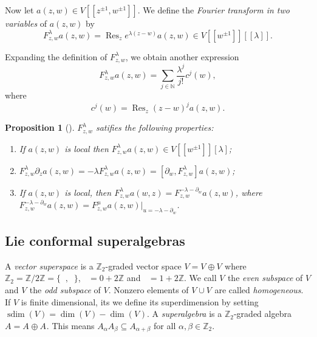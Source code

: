 \documentclass[a4paper, 12pt, reqno]{amsart}
\newtheorem{proposition}[theorem]{Proposition}
\theoremstyle{remark}
\numberwithin{equation}{subsection}
\DeclareMathOperator{\Res}{Res}
\DeclareMathOperator{\zero}{\overline{0}}
\DeclareMathOperator{\one}{\overline{1}}
\DeclareMathOperator{\sdim}{sdim}
\begin{document}
Now let $a(z, w) \in V[[z^{\pm 1}, w^{\pm 1}]]$.
We define the \emph{Fourier transform in two variables} of $a(z, w)$ by
\begin{equation*}
  F^\lambda_{z, w}a(z, w) = \Res_ze^{\lambda(z - w)}a(z, w) \in V[[w^{\pm 1}]][[\lambda]].
\end{equation*}

Expanding the definition of $F^\lambda_{z, w}$, we obtain another expression
\begin{equation*}
  F^\lambda_{z, w}a(z, w) = \sum_{j \in \mathbb{N}}\frac{\lambda^j}{j!}c^j(w),
\end{equation*}
where
\begin{equation*}
  c^j(w) = \Res_z(z - w)^ja(z, w).
\end{equation*}
\begin{proposition}[{\cite[Proposition 1.5.4]{nozaradan_introduction_2008}}]
  \label{prp:2}
  $F^\lambda_{z, w}$ satifies the following properties:
  \begin{enumerate}
  \item If $a(z, w)$ is local then $F^\lambda_{z, w}a(z, w) \in V[[w^{\pm 1}]][\lambda]$;
  \item $F^\lambda_{z, w}\partial_za(z, w) = -\lambda F^\lambda_{z, w}a(z, w) = [\partial_w, F^{\lambda}_{z, w}]a(z, w)$;
  \item If $a(z, w)$ is local, then $F^\lambda_{z, w}a(w, z) = F^{-\lambda - \partial_w}_{z, w}a(z, w)$, where $F^{-\lambda - \partial_w}_{z, w}a(z, w) = F^\mu_{z, w}a(z, w)|_{u = -\lambda - \partial_w}$.
  \end{enumerate}
\end{proposition}

\subsection{Lie conformal superalgebras}
\label{sec:lie-conf-super}

A \emph{vector superspace} is a $\mathbb{Z}_2$-graded vector space $V = V_{\zero} \oplus V_{\one}$ where $\mathbb{Z}_2 = \mathbb{Z}/2\mathbb{Z} = \{\zero, \one\}$, $\zero = 0 + 2\mathbb{Z}$ and $\one = 1 + 2\mathbb{Z}$.
We call $V_{\zero}$ the \emph{even subspace} of $V$ and $V_{\one}$ the \emph{odd subspace} of $V$.
Nonzero elements of $V_{\zero}\cup V_{\one}$ are called \emph{homogeneous}.
If $V$ is finite dimensional, its we define its superdimension by setting $\sdim(V) = \dim(V_{\zero}) - \dim(V_{\one})$.
A \emph{superalgebra} is a $\mathbb{Z}_2$-graded algebra $A = A_{\zero} \oplus A_{\one}$.
This means $A_{\alpha}A_{\beta} \subseteq A_{\alpha + \beta}$ for all $\alpha, \beta \in \mathbb{Z}_2$.
\end{document}
